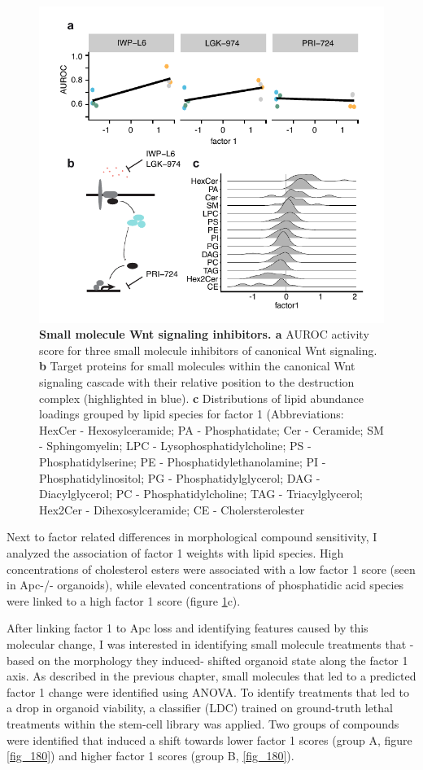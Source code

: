\begin{flushleft}
\begin{figure}[h]
\centering
\includegraphics[scale=0.75,keepaspectratio]{figures/adenomaprofiling/pdf/fig_2_2.pdf}
\caption{\textbf{Small molecule Wnt signaling inhibitors. a} AUROC activity score for three small molecule inhibitors of canonical Wnt signaling. \textbf{b} Target proteins for small molecules within the canonical Wnt signaling cascade with their relative position to the destruction complex (highlighted in blue). \textbf{c} Distributions of lipid abundance loadings grouped by lipid species for factor 1 (Abbreviations: HexCer - Hexosylceramide; PA - Phosphatidate; Cer - Ceramide; SM - Sphingomyelin; LPC - Lysophosphatidylcholine; PS - Phosphatidylserine; PE - Phosphatidylethanolamine; PI - Phosphatidylinositol; PG - Phosphatidylglycerol; DAG - Diacylglycerol; PC - Phosphatidylcholine; TAG - Triacylglycerol; Hex2Cer - Dihexosylceramide; CE - Cholersterolester}
\label{fig_199}
\end{figure}
\bigbreak

Next to factor related differences in morphological compound sensitivity, I analyzed the association of factor 1 weights with lipid species. High concentrations of cholesterol esters were associated with a low factor 1 score (seen in Apc-/- organoids), while elevated concentrations of phosphatidic acid species were linked to a high factor 1 score (figure \ref{fig_199}c).

After linking factor 1 to Apc loss and identifying features caused by this molecular change, I was interested in identifying small molecule treatments that -based on the morphology they induced- shifted organoid state along the factor 1 axis. As described in the previous chapter, small molecules that led to a predicted factor 1 change were identified using ANOVA. To identify treatments that led to a drop in organoid viability, a classifier (LDC) trained on ground-truth lethal treatments within the stem-cell library was applied. Two groups of compounds were identified that induced a shift towards lower factor 1 scores (group A, figure \ref{fig_180}) and higher factor 1 scores (group B, \ref{fig_180}). 


\end{flushleft}

